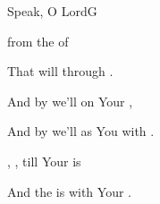\documentclass[12pt]{book}
\begin{document}
\begin{song}{Speak, O Lord}{G}
\begin{SBVerse}
  
    from the  of 

That will   
    through .

And by  we'll  
    on Your ,

And by  we'll  
    as You  with .

,  , 
    till Your  is 

And the  is  
    with Your .
\end{SBVerse}
\end{song}
\end{document}
